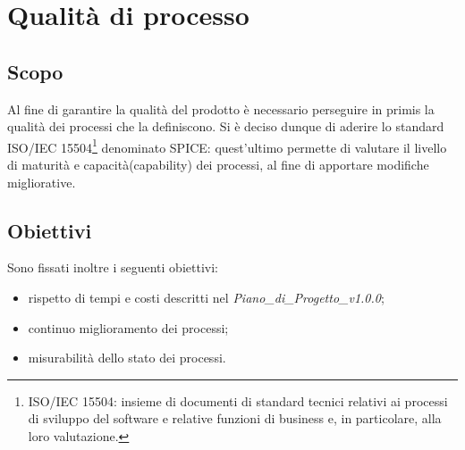 \section{Qualità di processo}
\subsection{Scopo}
Al fine di garantire la qualità del prodotto è necessario perseguire in primis la qualità dei processi che la definiscono. Si è deciso dunque di aderire lo standard ISO/IEC 15504\footnote{ISO/IEC 15504: insieme di documenti di standard tecnici relativi ai processi di sviluppo del software e relative funzioni di business e, in particolare, alla loro valutazione.} denominato SPICE\glo: quest'ultimo permette di valutare il livello di maturità e capacità\glo (capability) dei processi, al fine di apportare modifiche migliorative. 
\begin{comment}
Eliminato la subsection PDCA
\end{comment}
\subsection{Obiettivi}
Sono fissati inoltre i seguenti obiettivi: \begin{itemize}
\item rispetto di tempi e costi descritti nel \textit{Piano\_di\_Progetto\_v1.0.0};
\item continuo miglioramento dei processi;
\item misurabilità dello stato dei processi.
\end{itemize}

